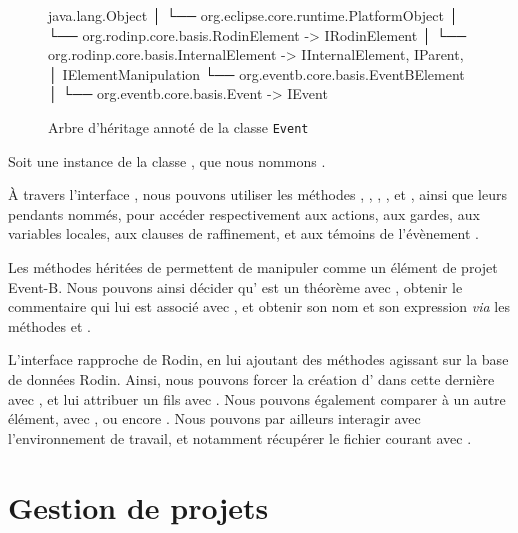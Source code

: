 \begin{figure}[H]
\centering
\begin{imtaConsole}
java.lang.Object
│
└── org.eclipse.core.runtime.PlatformObject
    │
    └── org.rodinp.core.basis.RodinElement              -> IRodinElement
        │
        └── org.rodinp.core.basis.InternalElement       -> IInternalElement, IParent,
            │                                              IElementManipulation
            └── org.eventb.core.basis.EventBElement
                │
                └── org.eventb.core.basis.Event         -> IEvent
\end{imtaConsole}
\caption{Arbre d'héritage annoté de la classe \texttt{Event}}
\label{fig:inheritanceTreeEvent}
\end{figure}

Soit une instance de la classe , que nous nommons .

À travers l'interface , nous pouvons utiliser les méthodes , , , %
, et , ainsi que leurs pendants nommés, pour accéder respectivement aux actions, aux gardes, aux variables locales, %
aux clauses de raffinement, et aux témoins de l'évènement .

Les méthodes héritées de  permettent de manipuler  comme un élément de projet Event-B.
Nous pouvons ainsi décider qu' est un théorème avec , obtenir le commentaire qui lui est associé avec , %
et obtenir son nom et son expression \textit{via} les méthodes  et .

L'interface  rapproche  de Rodin, en lui ajoutant des méthodes agissant sur la base de données Rodin.
Ainsi, nous pouvons forcer la création d' dans cette dernière avec , et lui attribuer un fils avec .
Nous pouvons également comparer  à un autre élément, avec , ou encore .
Nous pouvons par ailleurs interagir avec l'environnement de travail, et notamment récupérer le fichier courant avec .


\section{Gestion de projets}

